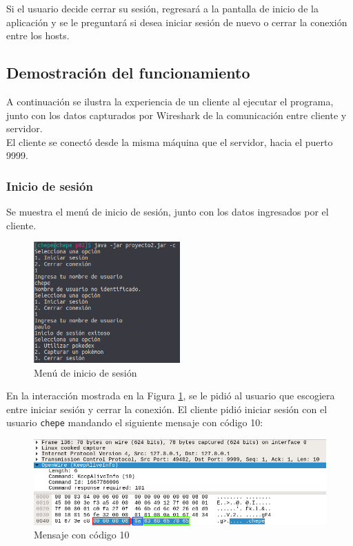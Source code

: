 \documentclass[12pt]{article}
\begin{document}
Si el usuario decide cerrar su sesión, regresará a la pantalla de inicio de la aplicación y se le preguntará si desea iniciar sesión de nuevo o cerrar la conexión entre los hosts. \\

\subsection{Demostración del funcionamiento}

A continuación se ilustra la experiencia de un cliente al ejecutar el programa, junto con los datos capturados por Wireshark de la comunicación entre cliente y servidor. \\

El cliente se conectó desde la misma máquina que el servidor, hacia el puerto 9999.

\subsubsection{Inicio de sesión}

Se muestra el menú de inicio de sesión, junto con los datos ingresados por el cliente.

\begin{figure}[H]
  \centering
  \includegraphics[width=0.5\textwidth]{01}
  \caption{Menú de inicio de sesión}
  \label{inicioSesion}
\end{figure}

En la interacción mostrada en la Figura \ref{inicioSesion}, se le pidió al usuario que escogiera entre iniciar sesión y cerrar la conexión. El cliente pidió iniciar sesión con el usuario \texttt{chepe} mandando el siguiente mensaje con código 10:
\begin{figure}[H]
  \centering
  \includegraphics[width=\textwidth]{03}
  \caption{Mensaje con código 10}
\end{figure}
\end{document}

